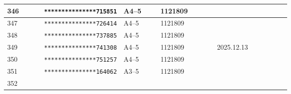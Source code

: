 \documentclass[UTF8,10pt,a4paper,fontset=fandol]{ctexart}
\newcommand{\fieldvalue}[1]{#1}
\newcommand{\handwritten}[1]{#1}
\begin{document}
\begin{center}
\begin{tabular}{|p{0.13\linewidth}|p{0.22\linewidth}|p{0.13\linewidth}|p{0.20\linewidth}|}
\hline
\fieldvalue{346}
&
\fieldvalue{\texttt{***************715851}}
&
\fieldvalue{A4--5}
&
\fieldvalue{1121809}
&\\
\hline
\fieldvalue{347}
&
\fieldvalue{\texttt{***************726414}}
&
\fieldvalue{A4--5}
&
\fieldvalue{1121809}
&\\
\hline
\fieldvalue{348}
&
\fieldvalue{\texttt{***************737885}}
&
\fieldvalue{A4--5}
&
\fieldvalue{1121809}
&\\
\hline
\fieldvalue{349}
&
\fieldvalue{\texttt{***************741308}}
&
\fieldvalue{A4--5}
&
\fieldvalue{1121809}
&
\fieldvalue{\handwritten{2025.12.13}}\\
\hline
\fieldvalue{350}
&
\fieldvalue{\texttt{***************751257}}
&
\fieldvalue{A4--5}
&
\fieldvalue{1121809}
&\\
\hline
\fieldvalue{351}
&
\fieldvalue{\texttt{***************164062}}
&
\fieldvalue{A3--5}
&
\fieldvalue{1121809}
&\\
\hline
\fieldvalue{352}

\end{tabular}
\end{center}
\end{document}
